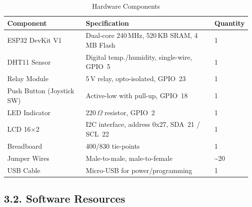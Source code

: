 \documentclass[12pt]{article}
\begin{document}
\begin{table}[H]
    \centering
    \caption{Hardware Components}
    \label{tab:hardware-resources}
    \begin{tabular}{|l|l|l|}
        \hline
        \textbf{Component} & \textbf{Specification} & \textbf{Quantity} \\
        \hline
        ESP32 DevKit V1 & Dual-core 240\,MHz, 520\,KB SRAM, 4\,MB Flash & 1 \\
        \hline
        DHT11 Sensor & Digital temp./humidity, single-wire, GPIO~5 & 1 \\
        \hline
        Relay Module & 5\,V relay, opto-isolated, GPIO~23 & 1 \\
        \hline
        Push Button (Joystick SW) & Active-low with pull-up, GPIO~18 & 1 \\
        \hline
        LED Indicator & 220\,$\Omega$ resistor, GPIO~2 & 1 \\
        \hline
        LCD 16$\times$2 & I2C interface, address 0x27, SDA~21 / SCL~22 & 1 \\
        \hline
        Breadboard & 400/830 tie-points & 1 \\
        \hline
        Jumper Wires & Male-to-male, male-to-female & \textasciitilde20 \\
        \hline
        USB Cable & Micro-USB for power/programming & 1 \\
        \hline
    \end{tabular}
\end{table}

\subsection*{3.2. Software Resources}
\end{document}
